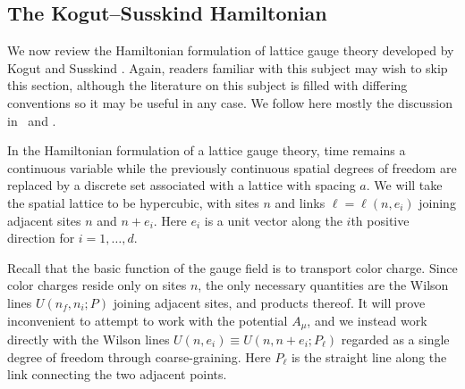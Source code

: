 \documentclass[reprint,superscriptaddress,pra,nofootinbib,preprintnumbers,floatfix]{revtex4-1}
\begin{document}
\subsection{The Kogut--Susskind Hamiltonian}
\label{sec:basics_KG}

We now review the Hamiltonian formulation of lattice gauge theory developed by Kogut and Susskind \cite{Kogut:1974ag,Banks:1975gq}. 
%
Again, readers familiar with this subject may wish to skip this section, although the literature on this subject is filled with differing conventions so it may be useful in any case. 
%
We follow here mostly the discussion in~\cite{Zohar:2014qma} and \cite{Zohar:2021nyc}.



In the Hamiltonian formulation of a lattice gauge theory, time remains a continuous variable while the previously continuous spatial degrees of freedom are replaced by a discrete set associated with a lattice with spacing $a$. 
%
We will take the spatial lattice to be hypercubic, with sites $n$ and links $\ell = \ell(n,e_i)$ joining adjacent sites $n$ and $n+e_i$. 
%
Here $e_i$ is a unit vector along the $i$th positive direction for $i = 1,\dotsc,d$.



Recall that the basic function of the gauge field is to transport color charge. 
%
Since color charges reside only on sites $n$, the only necessary quantities are the Wilson lines $U(n_f,n_i;P)$ joining adjacent sites, and products thereof. 
%
It will prove inconvenient to attempt to work with the potential $A_\mu$, and we instead work directly with the Wilson lines $U(n, e_i)\equiv U(n,n+e_i;P_\ell)$ regarded as a single degree of freedom through coarse-graining. Here $P_\ell$ is the straight line along the link connecting the two adjacent points.
\end{document}
